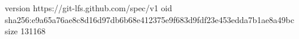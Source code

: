 version https://git-lfs.github.com/spec/v1
oid sha256:e9a65a76ae8c8d16d97db6b68e412375e9f683d9fdf23e453edda7b1ae8a49bc
size 131168

